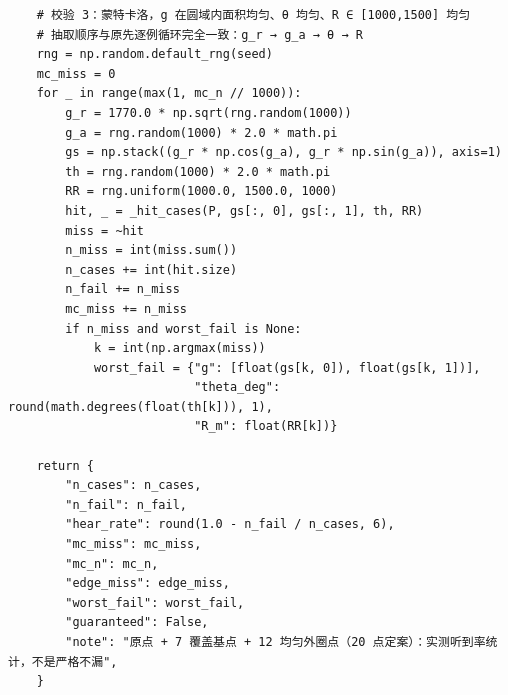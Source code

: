 \documentclass[UTF8, zihao=5,AutoFakeBold=2]{ctexart}
\begin{document}
\begin{lstlisting}
    # 校验 3：蒙特卡洛，g 在圆域内面积均匀、θ 均匀、R ∈ [1000,1500] 均匀
    # 抽取顺序与原先逐例循环完全一致：g_r → g_a → θ → R
    rng = np.random.default_rng(seed)
    mc_miss = 0
    for _ in range(max(1, mc_n // 1000)):
        g_r = 1770.0 * np.sqrt(rng.random(1000))
        g_a = rng.random(1000) * 2.0 * math.pi
        gs = np.stack((g_r * np.cos(g_a), g_r * np.sin(g_a)), axis=1)
        th = rng.random(1000) * 2.0 * math.pi
        RR = rng.uniform(1000.0, 1500.0, 1000)
        hit, _ = _hit_cases(P, gs[:, 0], gs[:, 1], th, RR)
        miss = ~hit
        n_miss = int(miss.sum())
        n_cases += int(hit.size)
        n_fail += n_miss
        mc_miss += n_miss
        if n_miss and worst_fail is None:
            k = int(np.argmax(miss))
            worst_fail = {"g": [float(gs[k, 0]), float(gs[k, 1])],
                          "theta_deg": round(math.degrees(float(th[k])), 1),
                          "R_m": float(RR[k])}

    return {
        "n_cases": n_cases,
        "n_fail": n_fail,
        "hear_rate": round(1.0 - n_fail / n_cases, 6),
        "mc_miss": mc_miss,
        "mc_n": mc_n,
        "edge_miss": edge_miss,
        "worst_fail": worst_fail,
        "guaranteed": False,
        "note": "原点 + 7 覆盖基点 + 12 均匀外圈点（20 点定案）：实测听到率统计，不是严格不漏",
    }
	\end{lstlisting}
\end{document}
